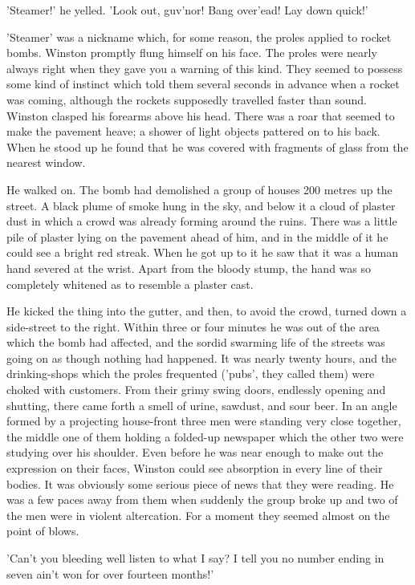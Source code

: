 \documentclass{article}
\begin{document}
'Steamer!' he yelled. 'Look out, guv'nor! Bang over'ead! Lay down quick!'

'Steamer' was a nickname which, for some reason, the proles applied to
rocket bombs. Winston promptly flung himself on his face. The proles were
nearly always right when they gave you a warning of this kind. They seemed
to possess some kind of instinct which told them several seconds in advance
when a rocket was coming, although the rockets supposedly travelled faster
than sound. Winston clasped his forearms above his head. There was a roar
that seemed to make the pavement heave; a shower of light objects pattered
on to his back. When he stood up he found that he was covered with
fragments of glass from the nearest window.

He walked on. The bomb had demolished a group of houses 200 metres up the
street. A black plume of smoke hung in the sky, and below it a cloud of
plaster dust in which a crowd was already forming around the ruins. There
was a little pile of plaster lying on the pavement ahead of him, and in
the middle of it he could see a bright red streak. When he got up to it he
saw that it was a human hand severed at the wrist. Apart from the bloody
stump, the hand was so completely whitened as to resemble a plaster cast.

He kicked the thing into the gutter, and then, to avoid the crowd, turned
down a side-street to the right. Within three or four minutes he was out
of the area which the bomb had affected, and the sordid swarming life of
the streets was going on as though nothing had happened. It was nearly
twenty hours, and the drinking-shops which the proles frequented ('pubs',
they called them) were choked with customers. From their grimy swing doors,
endlessly opening and shutting, there came forth a smell of urine, sawdust,
and sour beer. In an angle formed by a projecting house-front three men
were standing very close together, the middle one of them holding a
folded-up newspaper which the other two were studying over his shoulder.
Even before he was near enough to make out the expression on their faces,
Winston could see absorption in every line of their bodies. It was
obviously some serious piece of news that they were reading. He was a few
paces away from them when suddenly the group broke up and two of the men
were in violent altercation. For a moment they seemed almost on the point
of blows.

'Can't you bleeding well listen to what I say? I tell you no number ending
in seven ain't won for over fourteen months!'
\end{document}
